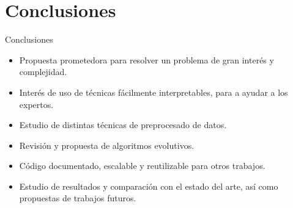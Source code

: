 \documentclass{beamer}
\begin{document}
\section{Conclusiones}
\begin{frame}{Conclusiones}

	\begin{itemize}
		\item Propuesta prometedora para resolver un problema de gran interés y complejidad.
		\item Interés de uso de técnicas fácilmente interpretables, para a ayudar a los expertos.
		\item Estudio de distintas técnicas de preprocesado de datos.
		\item Revisión y propuesta de algoritmos evolutivos.
		\item Código documentado, escalable y reutilizable para otros trabajos.
		\item Estudio de resultados y comparación con el estado del arte, así como propuestas de trabajos futuros.
	\end{itemize}

\end{frame}
\end{document}

